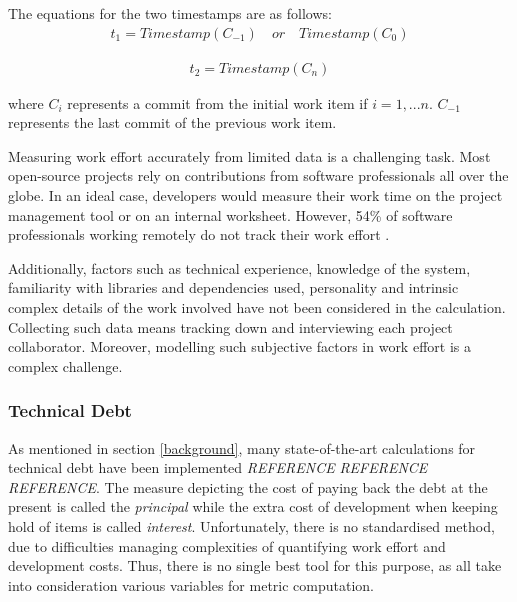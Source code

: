 \documentclass{mpaper}
\begin{document}
The equations for the two timestamps are as follows:
\begin{equation}
  \label{eq-commit-start}
  \begin{aligned}
    t_{1} = Timestamp(C_{-1}) \quad or \quad Timestamp(C_{0})
  \end{aligned}
\end{equation}

\begin{equation}
  \label{eq-commit-end}
  \begin{aligned}
    t_{2} = Timestamp(C_{n})
  \end{aligned}
\end{equation}

where $C_{i}$ represents a commit from the initial work item if $i = 1,...n$.
$C_{-1}$ represents the last commit of the previous work item.

Measuring work effort accurately from limited data is a challenging task. Most
open-source projects rely on contributions from software professionals all over
the globe. In an ideal case, developers would measure their work time on the
project management tool or on an internal worksheet. However, 54\% of software
professionals working remotely do not track their work effort
\cite{DeveloperSurvey2018}.

Additionally, factors such as technical experience, knowledge of the system,
familiarity with libraries and dependencies used, personality and intrinsic
complex details of the work involved have not been considered in the
calculation. Collecting such data means tracking down and interviewing each
project collaborator. Moreover, modelling such subjective factors in work effort
is a complex challenge.

\subsubsection*{Technical Debt}

As mentioned in section \ref{background}, many state-of-the-art calculations for
technical debt have been implemented \emph{REFERENCE} \emph{REFERENCE}
\emph{REFERENCE}. The measure depicting the cost of paying back the debt at the
present is called the \textit{principal} while the extra cost of development
when keeping hold of items is called \textit{interest}. Unfortunately, there is
no standardised method, due to difficulties managing complexities of quantifying
work effort and development costs. Thus, there is no single best tool for this
purpose, as all take into consideration various variables for metric computation. 
\end{document}
